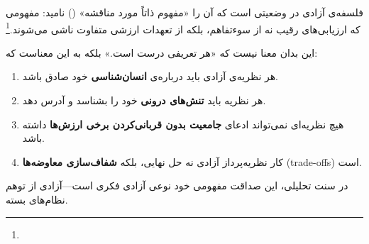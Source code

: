 \begin{center}
\end{center}

\vspace{0.5cm}

\begin{tcolorbox}[
  title={نتیجه‌گیری پیوست ب: آزادی—مفهومی که هیچ‌گاه بسته نمی‌شود},
  colback=PrimaryDeep!5, colframe=PrimaryDeep!60, fonttitle=\bfseries,
  breakable
]

فلسفه‌ی آزادی در وضعیتی است که  آن را «مفهوم ذاتاً مورد مناقشه» () نامید: مفهومی که ارزیابی‌های رقیب نه از سوء‌تفاهم، بلکه از تعهدات ارزشی متفاوت ناشی می‌شوند.\footnote{} %

این بدان معنا نیست که «هر تعریفی درست است.» بلکه به این معناست که:

\begin{enumerate}[leftmargin=2em, itemsep=4pt]
  \item هر نظریه‌ی آزادی باید درباره‌ی \textbf{انسان‌شناسی} خود صادق باشد.
  \item هر نظریه باید \textbf{تنش‌های درونی} خود را بشناسد و آدرس دهد.
  \item هیچ نظریه‌ای نمی‌تواند ادعای \textbf{جامعیت بدون قربانی‌کردن برخی ارزش‌ها} داشته باشد.
  \item کار نظریه‌پرداز آزادی نه حل نهایی، بلکه \textbf{شفاف‌سازی معاوضه‌ها} (trade-offs) است.
\end{enumerate}

در سنت تحلیلی، این صداقت مفهومی خود نوعی آزادی فکری است—آزادی از توهم نظام‌های بسته.

\end{tcolorbox}

